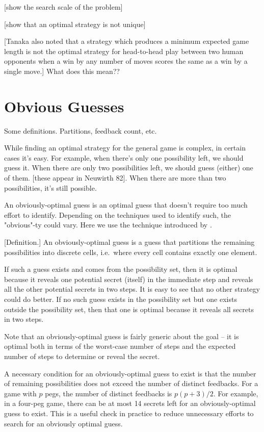 [show the search scale of the problem]

[show that an optimal strategy is not unique]

[Tanaka also noted that a strategy which produces a minimum expected
game length is not the optimal strategy for head-to-head play between two human
opponents when a win by any number of moves scores the same as a win by a
single move.] What does this mean??


\section{Obvious Guesses}

Some definitions. Partitions, feedback count, etc.



While finding an optimal strategy for the general game is complex, in certain cases it's easy. For example, when there's only one possibility left, we should guess it. When there are only two possibilities left, we should guess (either) one of them. [these appear in Neuwirth 82]. When there are more than two possibilities, it's still possible.

An obviously-optimal guess is an optimal guess that doesn't require too much effort to identify. Depending on the techniques used to identify such, the "obvious"-ty could vary. Here we use the technique introduced by \cite{koyama93}. 

[Definition.] An obviously-optimal guess is a guess that partitions the remaining possibilities into discrete cells, i.e.\ where every cell contains exactly one element. 

If such a guess exists and comes from the possibility set, then it is optimal because it reveals one potential secret (itself) in the immediate step and reveals all the other potential secrets in two steps. It is easy to see that no other strategy could do better. If no such guess exists in the possibility set but one exists outside the possibility set, then that one is optimal because it reveals all secrets in two steps. 

Note that an obviously-optimal guess is fairly generic about the goal -- it is optimal both in terms of the worst-case number of steps and the expected number of steps to determine or reveal the secret.

A necessary condition for an obviously-optimal guess to exist is that the number of remaining possibilities does not exceed the number of distinct feedbacks. For a game with $p$ pegs, the number of distinct feedbacks is $p(p+3)/2$. For example, in a four-peg game, there can be at most 14 secrets left for an obviously-optimal guess to exist. This is a useful check in practice to reduce unnecessary efforts to search for an obviously optimal guess.


